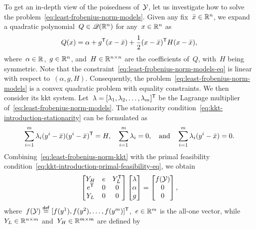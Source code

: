 To get an in-depth view of the poisedness of~$\xpt$, let us investigate how to solve the problem~\cref{eq:least-frobenius-norm-models}.
Given any fix~$\bar{x} \in \mathbb{R}^n$, we expand a quadratic polynomial~$Q \in \mathscr{Q}(\mathbb{R}^n)$ for any~$\iter \in \R^n$ as
\begin{equation*}
    Q(\iter) = \alpha + g^{\T} (\iter - \bar{x}) + \frac{1}{2} (\iter - \bar{x})^{\T} H(\iter - \bar{x}),
\end{equation*}
where~$\alpha \in \mathbb{R}$,~$g \in \mathbb{R}^n$, and~$H \in \mathbb{R}^{n \times n}$ are the coefficients of~$Q$, with~$H$ being symmetric.
Note that the constraint~\cref{eq:least-frobenius-norm-models-eq} is linear with respect to~$(\alpha, g, H)$.
Consequently, the problem~\cref{eq:least-frobenius-norm-models} is a convex quadratic problem with equality constraints.
We then consider its \gls{kkt} system.
Let~$\lm = [\lm_1, \lm_2, \dots, \lm_m]^{\T}$ be the Lagrange multiplier of~\cref{eq:least-frobenius-norm-models}.
The stationarity condition~\cref{eq:kkt-introduction-stationarity} can be formulated as
\begin{equation}
    \label{eq:least-frobenius-norm-kkt}
    \sum_{i = 1}^m \lm_i (y^i - \bar{x}) (y^i - \bar{x})^{\T} = H, \quad \sum_{i = 1}^m \lm_i = 0, \quad \text{and} \quad \sum_{i = 1}^m \lm_i (y^i - \bar{x}) = 0.
\end{equation}
Combining~\cref{eq:least-frobenius-norm-kkt} with the primal feasibility condition~\cref{eq:kkt-introduction-primal-feasibility-eq}, we obtain
\begin{equation}
    \label{eq:least-frobenius-kkt-system}
    \begin{bmatrix}
        Y_H     & e & Y_L^{\T}\\
        e^{\T}  & 0 & 0\\
        Y_L     & 0 & 0
    \end{bmatrix}
    \begin{bmatrix}
        \lm\\
        \alpha\\
        g
    \end{bmatrix}
    =
    \begin{bmatrix}
        \obj(\xpt)\\
        0\\
        0
    \end{bmatrix},
\end{equation}
where~$\obj(\xpt) \eqdef [\obj(y^1), \obj(y^2), \dots, \obj(y^m)]^{\T}$,~$e \in \mathbb{R}^m$ is the all-one vector, while~$Y_L \in \mathbb{R}^{n \times m}$ and~$Y_H \in \mathbb{R}^{m \times m}$ are defined by

